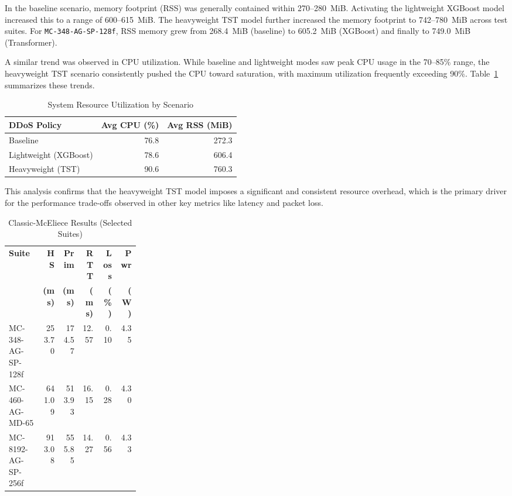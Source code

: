 \documentclass[sigconf,natbib=false]{acmart}
\begin{document}
In the baseline scenario, memory footprint (RSS) was generally contained within 270--280~MiB. Activating the lightweight XGBoost model increased this to a range of 600--615~MiB. The heavyweight TST model further increased the memory footprint to 742--780~MiB across test suites. For \texttt{MC-348-AG-SP-128f}, RSS memory grew from 268.4~MiB (baseline) to 605.2~MiB (XGBoost) and finally to 749.0~MiB (Transformer).

A similar trend was observed in CPU utilization. While baseline and lightweight modes saw peak CPU usage in the 70--85\% range, the heavyweight TST scenario consistently pushed the CPU toward saturation, with maximum utilization frequently exceeding 90\%. Table~\ref{tab:resource_utilization} summarizes these trends.

\begin{table}[ht]
\centering
\caption{System Resource Utilization by Scenario}
\label{tab:resource_utilization}
\begingroup
\small
\setlength{\tabcolsep}{3pt}
\begin{tabular}{@{}lrr@{}}
\toprule
\textbf{DDoS Policy} & \textbf{Avg CPU (\%)} & \textbf{Avg RSS (MiB)} \\
\midrule
Baseline & 76.8 & 272.3 \\
Lightweight (XGBoost) & 78.6 & 606.4 \\
Heavyweight (TST) & 90.6 & 760.3 \\
\bottomrule
\end{tabular}
\endgroup
\end{table}

This analysis confirms that the heavyweight TST model imposes a significant and consistent resource overhead, which is the primary driver for the performance trade-offs observed in other key metrics like latency and packet loss.

\begin{table}[ht]
\centering
\caption{Classic-McEliece Results (Selected Suites)}
\label{tab:mceliece_results}
\begingroup
\footnotesize
\setlength{\tabcolsep}{2pt}
\begin{tabular}{@{}p{0.26\linewidth}rrrrr@{}}
\toprule
\textbf{Suite} & \textbf{HS} & \textbf{Prim} & \textbf{RTT} & \textbf{Loss} & \textbf{Pwr} \\
 & \textbf{(ms)} & \textbf{(ms)} & \textbf{(ms)} & \textbf{(\%)} & \textbf{(W)} \\
\midrule
MC-348-AG-SP-128f & 253.70 & 174.57 & 12.57 & 0.10 & 4.35 \\
MC-460-AG-MD-65 & 641.09 & 513.93 & 16.15 & 0.28 & 4.30 \\
MC-8192-AG-SP-256f & 913.08 & 555.85 & 14.27 & 0.56 & 4.33 \\
\bottomrule
\end{tabular}
\endgroup
\end{table}
\end{document}
